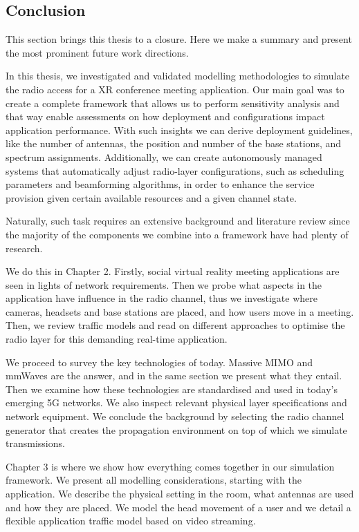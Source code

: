 \subsection*{Conclusion}

This section brings this thesis to a closure. Here we make a summary and present the most prominent future work directions.

In this thesis, we investigated and validated modelling methodologies to simulate the radio access for a XR conference meeting application. Our main goal was to create a complete framework that allows us to perform sensitivity analysis and that way enable assessments on how deployment and configurations impact application performance. With such insights we can derive deployment guidelines, like the number of antennas, the position and number of the base stations, and spectrum assignments. Additionally, we can create autonomously managed systems that automatically adjust radio-layer configurations, such as scheduling parameters and beamforming algorithms, in order to enhance the service provision given certain available resources and a given channel state.

Naturally, such task requires an extensive background and literature review since the majority of the components we combine into a framework have had plenty of research.

We do this in Chapter 2. Firstly, social virtual reality meeting applications are seen in lights of network requirements. Then we probe what aspects in the application have influence in the radio channel, thus we investigate where cameras, headsets and base stations are placed, and how users move in a meeting. Then, we review traffic models and read on different approaches to optimise the radio layer for this demanding real-time application.

We proceed to survey the key technologies of today. Massive MIMO and mmWaves are the answer, and in the same section we present what they entail. Then we examine how these technologies are standardised and used in today's emerging 5G networks. We also inspect relevant physical layer specifications and network equipment. We conclude the background by selecting the radio channel generator that creates the propagation environment on top of which we simulate transmissions.

Chapter 3 is where we show how everything comes together in our simulation framework. We present all modelling considerations, starting with the application. We describe the physical setting in the room, what antennas are used and how they are placed. We model the head movement of a user and we detail a flexible application traffic model based on video streaming.

